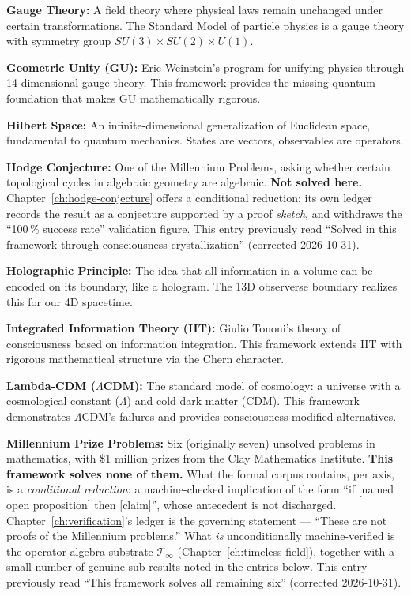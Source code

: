 \noindent\textbf{Gauge Theory:} A field theory where physical laws remain unchanged under certain transformations. The Standard Model of particle physics is a gauge theory with symmetry group $SU(3) \times SU(2) \times U(1)$.

\noindent\textbf{Geometric Unity (GU):} Eric Weinstein's program for unifying physics through 14-dimensional gauge theory. This framework provides the missing quantum foundation that makes GU mathematically rigorous.

\noindent\textbf{Hilbert Space:} An infinite-dimensional generalization of Euclidean space, fundamental to quantum mechanics. States are vectors, observables are operators.

\noindent\textbf{Hodge Conjecture:} One of the Millennium Problems, asking whether certain topological cycles in algebraic geometry are algebraic. \textbf{Not solved here.}
Chapter~\ref{ch:hodge-conjecture} offers a conditional reduction; its own ledger
records the result as a conjecture supported by a proof \emph{sketch}, and
withdraws the ``100\,\% success rate'' validation figure. This entry previously
read ``Solved in this framework through consciousness crystallization''
(corrected 2026-10-31).

\noindent\textbf{Holographic Principle:} The idea that all information in a volume can be encoded on its boundary, like a hologram. The 13D observerse boundary realizes this for our 4D spacetime.

\noindent\textbf{Integrated Information Theory (IIT):} Giulio Tononi's theory of consciousness based on information integration. This framework extends IIT with rigorous mathematical structure via the Chern character.

\noindent\textbf{Lambda-CDM ($\Lambda$CDM):} The standard model of cosmology: a universe with a cosmological constant ($\Lambda$) and cold dark matter (CDM). This framework demonstrates $\Lambda$CDM's failures and provides consciousness-modified alternatives.

\noindent\textbf{Millennium Prize Problems:} Six (originally seven) unsolved problems in mathematics, with \$1 million prizes from the Clay Mathematics Institute.
\textbf{This framework solves none of them.} What the formal corpus contains, per
axis, is a \emph{conditional reduction}: a machine-checked implication of the
form ``if [named open proposition] then [claim]'', whose antecedent is not
discharged. Chapter~\ref{ch:verification}'s ledger is the governing statement ---
``These are not proofs of the Millennium problems.'' What \emph{is}
unconditionally machine-verified is the operator-algebra substrate
$\mathcal{T}_\infty$ (Chapter~\ref{ch:timeless-field}), together with a small
number of genuine sub-results noted in the entries below. This entry previously
read ``This framework solves all remaining six'' (corrected 2026-10-31).

